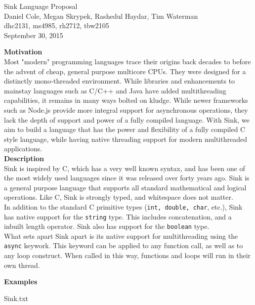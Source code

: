 \documentclass[11pt, oneside]{article}   	%
\date{}							%
\begin{document}
\begin{center}
\LARGE
Sink Language Proposal\\[2em]
\Large 
Daniel Cole, Megan Skrypek, Rashedul Haydar, Tim Waterman\\
\large dhc2131, ms4985, rh2712, tbw2105\\[2em]
\normalsize
September 30, 2015\\[3em]
\end{center}

\LARGE\textbf{Motivation}\\[.5em]
\normalsize
Most "modern" programming languages trace their origins back decades to before the advent of cheap, general purpose multicore CPUs.  They were designed for a distinctly mono-threaded environment.  While libraries and enhancements to mainstay languages such as C/C++ and Java have added multithreading capabilities, it remains in many ways bolted on kludge.  While newer frameworks such as Node.js provide more integral support for asynchronous operations, they lack the depth of support and power of a fully compiled language.  With Sink, we aim to build a language that has the power and flexibility of a fully compiled C style language, while having native threading support for modern multithreaded applications.
\\[3em]
\LARGE\textbf{Description}\\[.5em]
\normalsize
Sink is inspired by C, which has a very well known syntax, and has been one of the most widely used languages since it was released over forty years ago.  Sink is a general purpose language that supports all standard mathematical and logical operations.  Like C, Sink is strongly typed, and whitespace does not matter.\\[.5em]
In addition to the standard C primitive types (\verb|int, double, char|, etc.), Sink has native support for the \verb|string| type.  This includes concatenation, and a inbuilt length operator.  Sink also has support for the \verb|boolean| type.\\[.5em]
What sets apart Sink apart is its native support for multithreading using the \verb|async| keywork.  This keyword can be applied to any function call, as well as to any loop construct.  When called in this way, functions and loops will run in their own thread.  

\newpage

\LARGE\textbf{Examples}\\[.5em]
\normalsize

{Sink.txt}
\end{document}
